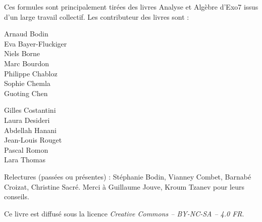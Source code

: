 \begin{multicols}{2}
Ces formules sont principalement tirées des livres \og{}Analyse\fg{} et \og{}Algèbre\fg{} d'Exo7 issus d'un large travail collectif.
Les contributeur des livres sont :
{
	\setlength{\columnseprule}{0pt}
	\center
\begin{multicols}{2}	
			Arnaud Bodin\\
			Eva Bayer-Fluckiger\\
			Niels Borne\\
			Marc Bourdon\\
			Philippe Chabloz\\
			Sophie Chemla\\			
			Guoting Chen

			
			Gilles Costantini\\
			Laura Desideri\\
			Abdellah Hanani\\
			Jean-Louis Rouget\\
			Pascal Romon\\
			Lara Thomas\\
\end{multicols}			
}


Relectures (passées ou présentes) : Stéphanie Bodin, Vianney Combet, Barnabé Croizat, Christine Sacré.
Merci à Guillaume Jouve, Kroum Tzanev pour leurs conseils.

\end{multicols}

\vspace*{\fill}

\bigskip 

\begin{center}
\end{center}



\begin{center}
Ce livre est diffusé sous la licence \emph{Creative Commons -- BY-NC-SA -- 4.0 FR}.
\end{center}



